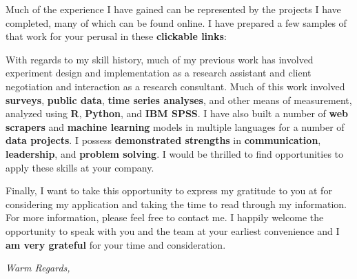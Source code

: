 \documentclass[8pt,a4paper,ragged2e,withhyper]{altacv}
\begin{document}
\begin{changemargin}{0.5cm}{0.7cm}
Much of the experience I have gained can be represented by the projects I have completed, many of which can be found online. I have prepared a few samples of that work for your perusal in these \textbf{clickable links}:\\\medskip
\setlength{\parindent}{0pt}

\setlength{\parindent}{1.5em}

With regards to my skill history, much of my previous work has involved experiment design and implementation as a research assistant and client negotiation and interaction as a research consultant. Much of this work involved \textbf{surveys}, \textbf{public data}, \textbf{time series analyses}, and other means of measurement, analyzed using \textbf{R}, \textbf{Python}, and \textbf{IBM SPSS}. I have also built a number of \textbf{web scrapers} and \textbf{machine learning} models in multiple languages for a number of \textbf{data projects}. I possess \textbf{demonstrated strengths} in \textbf{communication}, \textbf{leadership}, and \textbf{problem solving}. I would be thrilled to find opportunities to apply these skills at your company.


Finally, I want to take this opportunity to express my gratitude to you at \empName{} for considering my application and taking the time to read through my information. For more information, please feel free to contact me. I happily welcome the opportunity to speak with you and the team at your earliest convenience and I \textbf{am very grateful} for your time and consideration. 

\setlength{\parindent}{0pt}
\large{\emph{\color{accent}Warm Regards,}}


\end{changemargin}
\end{document}
